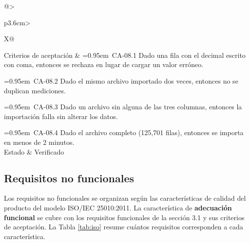 \documentclass[11pt,a4paper,oneside]{article}
\begin{document}
\begin{xltabular}{\textwidth}{@{}>{\sffamily\bfseries\small\raggedright\arraybackslash}p{3.6cm}>{\small\raggedright\arraybackslash}X@{}}
Criterios de aceptación & \hangindent=0.95em\textbullet\ CA-08.1 Dado una fila con el decimal escrito con coma, entonces se rechaza en lugar de cargar un valor erróneo.\par \hangindent=0.95em\textbullet\ CA-08.2 Dado el mismo archivo importado dos veces, entonces no se duplican mediciones.\par \hangindent=0.95em\textbullet\ CA-08.3 Dado un archivo sin alguna de las tres columnas, entonces la importación falla sin alterar los datos.\par \hangindent=0.95em\textbullet\ CA-08.4 Dado el archivo completo (125,701 filas), entonces se importa en menos de 2 minutos.\\ \hline
Estado & Verificado\\ \hline
\end{xltabular}
\vspace{0.8em}

\subsection{Requisitos no funcionales}

Los requisitos no funcionales se organizan según las características de calidad del producto del modelo ISO/IEC 25010:2011. La característica de \textbf{adecuación funcional} se cubre con los requisitos funcionales de la sección 3.1 y sus criterios de aceptación. La Tabla \ref{tab:iso} resume cuántos requisitos corresponden a cada característica.
\end{document}
